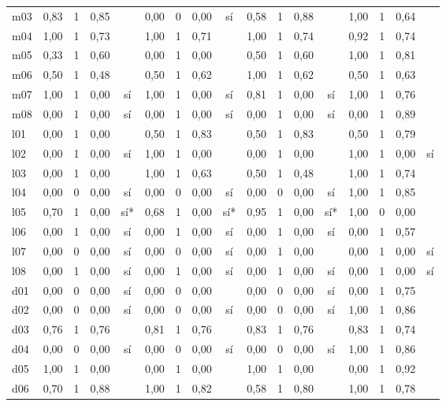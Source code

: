 \begin{scriptsize}
\begin{longtable}{@{}l rrrc rrrc rrrc rrrc@{}}
m03 & 0,83 & 1 & 0,85 &  & 0,00 & 0 & 0,00 & sí & 0,58 & 1 & 0,88 &  & 1,00 & 1 & 0,64 &  \\
m04 & 1,00 & 1 & 0,73 &  & 1,00 & 1 & 0,71 &  & 1,00 & 1 & 0,74 &  & 0,92 & 1 & 0,74 &  \\
m05 & 0,33 & 1 & 0,60 &  & 0,00 & 1 & 0,00 &  & 0,50 & 1 & 0,60 &  & 1,00 & 1 & 0,81 &  \\
m06 & 0,50 & 1 & 0,48 &  & 0,50 & 1 & 0,62 &  & 1,00 & 1 & 0,62 &  & 0,50 & 1 & 0,63 &  \\
m07 & 1,00 & 1 & 0,00 & sí & 1,00 & 1 & 0,00 & sí & 0,81 & 1 & 0,00 & sí & 1,00 & 1 & 0,76 &  \\
m08 & 0,00 & 1 & 0,00 & sí & 0,00 & 1 & 0,00 & sí & 0,00 & 1 & 0,00 & sí & 0,00 & 1 & 0,89 &  \\
l01 & 0,00 & 1 & 0,00 &  & 0,50 & 1 & 0,83 &  & 0,50 & 1 & 0,83 &  & 0,50 & 1 & 0,79 &  \\
l02 & 0,00 & 1 & 0,00 & sí & 1,00 & 1 & 0,00 &  & 0,00 & 1 & 0,00 &  & 1,00 & 1 & 0,00 & sí \\
l03 & 0,00 & 1 & 0,00 &  & 1,00 & 1 & 0,63 &  & 0,50 & 1 & 0,48 &  & 1,00 & 1 & 0,74 &  \\
l04 & 0,00 & 0 & 0,00 & sí & 0,00 & 0 & 0,00 & sí & 0,00 & 0 & 0,00 & sí & 1,00 & 1 & 0,85 &  \\
l05 & 0,70 & 1 & 0,00 & sí* & 0,68 & 1 & 0,00 & sí* & 0,95 & 1 & 0,00 & sí* & 1,00 & 0 & 0,00 &  \\
l06 & 0,00 & 1 & 0,00 & sí & 0,00 & 1 & 0,00 & sí & 0,00 & 1 & 0,00 & sí & 0,00 & 1 & 0,57 &  \\
l07 & 0,00 & 0 & 0,00 & sí & 0,00 & 0 & 0,00 & sí & 0,00 & 1 & 0,00 &  & 0,00 & 1 & 0,00 & sí \\
l08 & 0,00 & 1 & 0,00 & sí & 0,00 & 1 & 0,00 & sí & 0,00 & 1 & 0,00 & sí & 0,00 & 1 & 0,00 & sí \\
d01 & 0,00 & 0 & 0,00 & sí & 0,00 & 0 & 0,00 &  & 0,00 & 0 & 0,00 & sí & 0,00 & 1 & 0,75 &  \\
d02 & 0,00 & 0 & 0,00 & sí & 0,00 & 0 & 0,00 & sí & 0,00 & 0 & 0,00 & sí & 1,00 & 1 & 0,86 &  \\
d03 & 0,76 & 1 & 0,76 &  & 0,81 & 1 & 0,76 &  & 0,83 & 1 & 0,76 &  & 0,83 & 1 & 0,74 &  \\
d04 & 0,00 & 0 & 0,00 & sí & 0,00 & 0 & 0,00 & sí & 0,00 & 0 & 0,00 & sí & 1,00 & 1 & 0,86 &  \\
d05 & 1,00 & 1 & 0,00 &  & 0,00 & 1 & 0,00 &  & 1,00 & 1 & 0,00 &  & 0,00 & 1 & 0,92 &  \\
d06 & 0,70 & 1 & 0,88 &  & 1,00 & 1 & 0,82 &  & 0,58 & 1 & 0,80 &  & 1,00 & 1 & 0,78 &  \\

\end{longtable}
\end{scriptsize}
